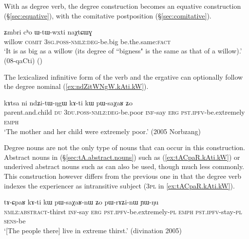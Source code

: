 With  as degree verb, the degree construction becomes an equative construction (§\ref{sec:equative}), with the comitative postposition  (§\ref{sec:comitative}). 

\begin{exe}
\ex \label{ex:WtWwxti.naXtCWG}
\gll ʑmbri cʰo ɯ-tɯ-wxti naχtɕɯɣ \\
willow \textsc{comit} \textsc{3sg}.\textsc{poss}-\textsc{nmlz}:\textsc{deg}-be.big be.the.same:\textsc{fact} \\
\glt `It is as big as a willow (its degree of ``bigness" is the same as that of a willow).' (08-qaCti)
()
\end{exe}

The lexicalized infinitive form  of the verb  and the ergative can optionally follow the degree nominal (\ref{ex:ndZitWNgW.kAti.kW}).

\begin{exe}
\ex \label{ex:ndZitWNgW.kAti.kW}
\gll kɤtsa ni ndʑi-tɯ-ŋgɯ kɤ-ti kɯ pɯ-saχaʁ ʑo \\
parent.and.child \textsc{du} \textsc{3du}.\textsc{poss}-\textsc{nmlz}:\textsc{deg}-be.poor \textsc{inf}-say \textsc{erg} \textsc{pst}.\textsc{ipfv}-be.extremely \textsc{emph} \\
\glt `The mother and her child were extremely poor.' (2005 Norbzang)
\end{exe}

Degree nouns are not the only type of nouns that can occur in this construction. Abstract nouns in  (§\ref{sec:tA.abstract.nouns}) such as  (\ref{ex:tACpaR.kAti.kW}) or underived abstract nouns such as  can also be used, though much less commonly.  This construction however differs from the previous one in that the degree verb  indexes the experiencer as intransitive subject (\textsc{3pl} in \ref{ex:tACpaR.kAti.kW}).
  
\begin{exe}
\ex \label{ex:tACpaR.kAti.kW}
\gll  tɤ-ɕpaʁ kɤ-ti kɯ pɯ-saχaʁ-nɯ ʑo pɯ-rɤʑi-nɯ ɲɯ-ŋu  \\
\textsc{nmlz}:\textsc{abstract}-thirst \textsc{inf}-say \textsc{erg} \textsc{pst}.\textsc{ipfv}-be.extremely-\textsc{pl} \textsc{emph} \textsc{pst}.\textsc{ipfv}-stay-\textsc{pl} \textsc{sens}-be \\
\glt `[The people there] live in extreme thirst.' (divination 2005)
\end{exe}


